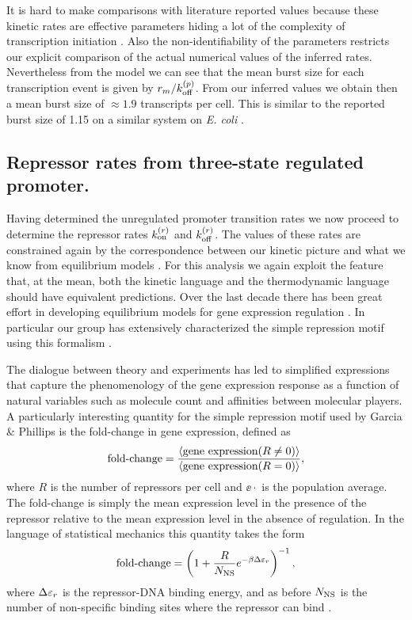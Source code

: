 It is hard to make comparisons with literature reported values because these
kinetic rates are effective parameters hiding a lot of the complexity of
transcription initiation \cite{Browning2004}. Also the non-identifiability of
the parameters restricts our explicit comparison of the actual numerical values
of the inferred rates. Nevertheless from the model we can see that the mean
burst  size for each transcription event is given by $r_m / k^{(p)}_{\text{off}}$. From our
inferred values we obtain then a mean burst size of $\approx 1.9$ transcripts
per cell. This is similar to the reported burst size of 1.15 on a similar
system on \textit{E. coli} \cite{Yu2006}.

\subsection{Repressor rates from three-state regulated promoter.}

Having determined the unregulated promoter transition rates we now proceed to
determine the repressor rates $k^{(r)}_{\text{on}}$ and $k^{(r)}_{\text{off}}$. The values of these rates
are constrained again by the correspondence between our kinetic picture and
what we know from equilibrium models \cite{Phillips2015}. For this analysis we
again exploit the feature that, at the mean, both the kinetic language and the
thermodynamic language should have equivalent predictions. Over the last decade
there has been great effort in developing equilibrium models for gene
expression regulation \cite{Buchler2003, Vilar2011, Bintu2005a}. In particular
our group has extensively characterized the simple repression motif using this
formalism \cite{Garcia2011c, Brewster2014, Razo-Mejia2018}.

The dialogue between theory and experiments has led to simplified expressions
that capture the phenomenology of the gene expression response as a function of
natural variables such as molecule count and affinities between molecular
players. A particularly interesting quantity for the simple repression motif
used by Garcia \& Phillips \cite{Garcia2011c} is the fold-change in gene
expression, defined as
\begin{equation}
  \text{fold-change} = {\left\langle \text{gene expression}(R \neq 0) \right\rangle \over
                 \left\langle \text{gene expression}(R = 0) \right\rangle},
\end{equation}
where $R$ is the number of repressors per cell and $\ee{\cdot}$ is the
population average. The fold-change is simply the mean expression level in the
presence of the repressor relative to the mean expression level in the absence
of regulation. In the language of statistical mechanics this quantity takes the
form
\begin{equation}
  \text{fold-change} = \left( 1 + {R \over N_\text{NS}} e^{-\beta\Delta\varepsilon_r} \right)^{-1},
  \label{seq_fc_thermo}
\end{equation}
where $\Delta\varepsilon_r$ is the repressor-DNA binding energy, and as before $N_\text{NS}$ is the
number of non-specific binding sites where the repressor can bind
\cite{Garcia2011c}.

